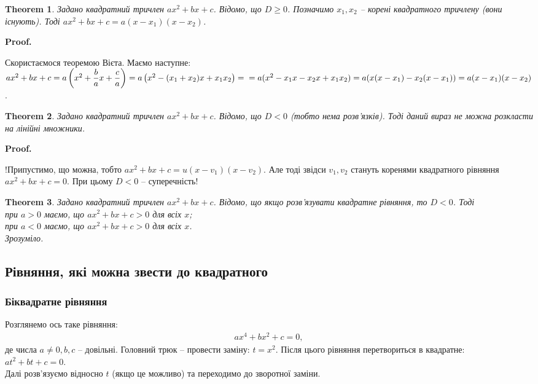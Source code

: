 \documentclass[a4paper, 10pt]{article}
\makeatletter
\def\qed{$\blacksquare$}
\theoremstyle{theoremdd}
\newtheorem{theorem}{Theorem}[subsection]
\theoremstyle{theoremdd}
\theoremstyle{theoremdd}
\theoremstyle{theoremdd}
\theoremstyle{theoremdd}
\theoremstyle{theoremdd}
\theoremstyle{theoremdd}
\theoremstyle{theoremdd}
\renewenvironment{proof}[1][Proof.\\]{\par
\pushQED{\hfill \qed}%
\normalfont \topsep6\p@\@plus6\p@\relax
\trivlist
\item\relax
{\bfseries
#1\@addpunct{.}}\hspace\labelsep\ignorespaces
}{%
\popQED\endtrivlist\@endpefalse
}
\makeatother
\begin{document}
\begin{theorem}
Задано квадратний тричлен $ax^2+bx+c$. Відомо, що $D \geq 0$. Позначимо $x_1,x_2$ -- корені квадратного тричлену (вони існують). Тоді $ax^2+bx+c = a(x-x_1)(x-x_2)$.
\end{theorem}

\begin{proof}
Скористаємося теоремою Вієта. Маємо наступне:\\
$ax^2 + bx + c = a\left(x^2 + \dfrac{b}{a}x + \dfrac{c}{a}\right) = a\left( x^2 - (x_1+x_2)x + x_1x_2 \right) = \\ = a(x^2 - x_1x - x_2x +x_1x_2) = a(x(x-x_1) - x_2(x-x_1)) = a(x-x_1)(x-x_2)$.
\end{proof}

\begin{theorem}
Задано квадратний тричлен $ax^2+bx+c$. Відомо, що $D < 0$ (тобто нема розв'язків). Тоді даний вираз не можна розкласти на лінійні множники.
\end{theorem}

\begin{proof}
!Припустимо, що можна, тобто $ax^2 + bx + c = u(x-v_1)(x-v_2)$. Але тоді звідси $v_1,v_2$ стануть коренями квадратного рівняння $ax^2 + bx + c = 0$. При цьому $D < 0$ -- суперечність!
\end{proof}

\begin{theorem}
Задано квадратний тричлен $ax^2+bx+c$. Відомо, що якщо розв'язувати квадратне рівняння, то $D < 0$. Тоді\\
при $a > 0$ маємо, що $ax^2+bx+c > 0$ для всіх $x$;\\
при $a < 0$ маємо, що $ax^2+bx+c > 0$ для всіх $x$.\\
\textit{Зрозуміло.}
\end{theorem}

\subsection{Рівняння, які можна звести до квадратного}
\subsubsection{Біквадратне рівняння}
Розглянемо ось таке рівняння:
\begin{align*}
ax^4 + bx^2 + c = 0,
\end{align*}
де числа $a \neq 0,b,c$ -- довільні. Головний трюк -- провести заміну: $t = x^2$. Після цього рівняння перетвориться в квадратне:\\
$at^2 + bt + c = 0$.\\
Далі розв'язуємо відносно $t$ (якщо це можливо) та переходимо до зворотної заміни.
\end{document}
